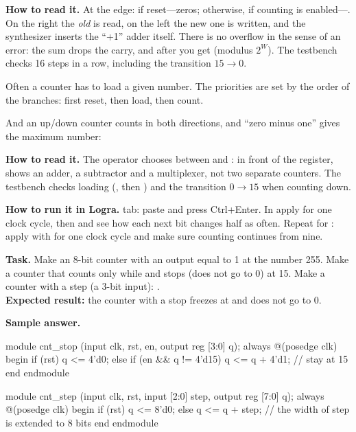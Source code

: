 
\textbf{How to read it.} At the edge: if reset---zeros; otherwise, if counting is
enabled---. On the right the \emph{old}  is read, on
the left the new one is written, and the synthesizer inserts the ``+1'' adder
itself. There is no overflow in the sense of an error: the sum drops the carry,
and after  you get  (modulus $2^W$). The testbench
 checks 16 steps in a row, including the transition
$15\to0$.

Often a counter has to load a given number. The priorities are set by the order
of the  branches: first reset, then load, then count.


And an up/down counter counts in both directions, and ``zero minus one'' gives
the maximum number:


\textbf{How to read it.} The  operator chooses between  and
: in front of the register,  shows an adder, a subtractor
and a multiplexer, not two separate counters. The testbench checks loading
(, then ) and the transition $0\to15$ when counting down.

\textbf{How to run it in Logra.}  tab: paste  and
press Ctrl+Enter. In  apply  for one clock cycle,
then  and see how each next bit changes half as often. Repeat for
: apply  with  for one clock cycle and
make sure counting continues from nine.

\begin{diybox}
\textbf{Task.}  Make an 8-bit counter with an output  equal
to 1 at the number 255.  Make a counter that counts only while
 and stops (does not go to 0) at 15.  Make a counter with a
step  (a 3-bit input): .\\
\textbf{Expected result:} the counter with a stop freezes at  and does
not go to 0.
\end{diybox}

\textbf{Sample answer.}
\begin{vcode}
module cnt_stop (input clk, rst, en, output reg [3:0] q);
    always @(posedge clk) begin
        if (rst)                  q <= 4'd0;
        else if (en && q != 4'd15) q <= q + 4'd1;   // stay at 15
    end
endmodule

module cnt_step (input clk, rst, input [2:0] step, output reg [7:0] q);
    always @(posedge clk) begin
        if (rst) q <= 8'd0;
        else     q <= q + step;       // the width of step is extended to 8 bits
    end
endmodule
\end{vcode}

